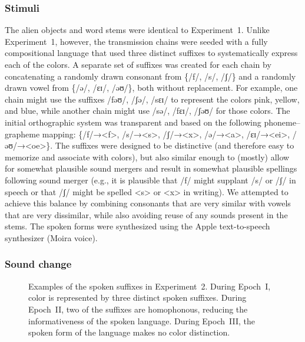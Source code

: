 \documentclass[doc,biblatex]{apa7}
\begin{document}
\subsubsection{Stimuli}

The alien objects and word stems were identical to Experiment~1. Unlike Experiment~1, however, the transmission chains were seeded with a fully compositional language that used three distinct suffixes to systematically express each of the colors. A separate set of suffixes was created for each chain by concatenating a randomly drawn consonant from \{/f/, /s/, /ʃ/\} and a randomly drawn vowel from \{/ə/, /ɛɪ/, /əʊ/\}, both without replacement. For example, one chain might use the suffixes /fəʊ/, /ʃə/, /sɛɪ/ to represent the colors pink, yellow, and blue, while another chain might use /sə/, /fɛɪ/, /ʃəʊ/ for those colors. The initial orthographic system was transparent and based on the following phoneme–grapheme mapping: \{/f/→<f>, /s/→<s>, /ʃ/→<x>, /ə/→<a>, /ɛɪ/→<ei>, /əʊ/→<oe>\}. The suffixes were designed to be distinctive (and therefore easy to memorize and associate with colors), but also similar enough to (mostly) allow for somewhat plausible sound mergers and result in somewhat plausible spellings following sound merger (e.g., it is plausible that /f/ might supplant /s/ or /ʃ/ in speech or that /ʃ/ might be spelled <s> or <x> in writing). We attempted to achieve this balance by combining consonants that are very similar with vowels that are very dissimilar, while also avoiding reuse of any sounds present in the stems. The spoken forms were synthesized using the Apple text-to-speech synthesizer (Moira voice).

\subsubsection{Sound change}

	\begin{figure}
	\vspace*{2pt}
	\caption{Examples of the spoken suffixes in Experiment~2. During Epoch~I, color is represented by three distinct spoken suffixes. During Epoch~II, two of the suffixes are homophonous, reducing the informativeness of the spoken language. During Epoch~III, the spoken form of the language makes no color distinction.}
	\label{sound_change}
	\end{figure}
\end{document}

